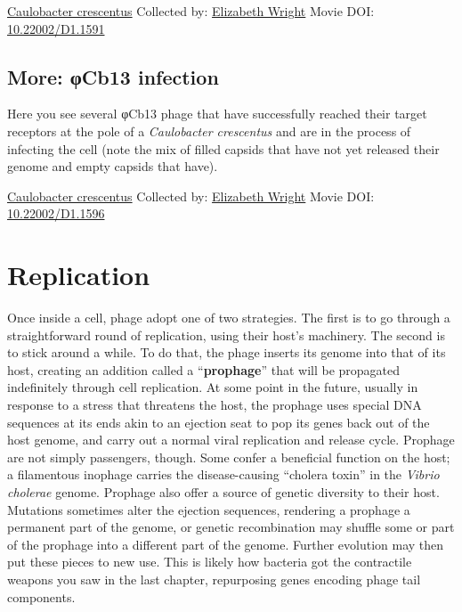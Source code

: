 \documentclass[]{tufte-book}
\begin{document}
\hypertarget{htmlwidget-69c7801d9096ef8e00a6}{}

\label{fig:10-6}\protect\hyperlink{tree}{Caulobacter crescentus} Collected by: \protect\hyperlink{elizabeth_wright}{Elizabeth Wright} Movie DOI: \href{https://doi.org/10.22002/D1.1591}{10.22002/D1.1591}

\hypertarget{ux3c6Cb13_infection}{%
\subsection*{More: φCb13 infection}\label{ux3c6Cb13_infection}}

Here you see several φCb13 phage that have successfully reached their target receptors at the pole of a \emph{Caulobacter crescentus} and are in the process of infecting the cell (note the mix of filled capsids that have not yet released their genome and empty capsids that have).



\hypertarget{htmlwidget-ed3b31bec6cdc505b2fe}{}

\label{fig:10-6a}\protect\hyperlink{tree}{Caulobacter crescentus} Collected by: \protect\hyperlink{elizabeth_wright}{Elizabeth Wright} Movie DOI: \href{https://doi.org/10.22002/D1.1596}{10.22002/D1.1596}

\hypertarget{replication}{%
\section{Replication}\label{replication}}

Once inside a cell, phage adopt one of two strategies. The first is to go through a straightforward round of replication, using their host's machinery. The second is to stick around a while. To do that, the phage inserts its genome into that of its host, creating an addition called a ``\textbf{prophage}'' that will be propagated indefinitely through cell replication. At some point in the future, usually in response to a stress that threatens the host, the prophage uses special DNA sequences at its ends akin to an ejection seat to pop its genes back out of the host genome, and carry out a normal viral replication and release cycle. Prophage are not simply passengers, though. Some confer a beneficial function on the host; a filamentous inophage carries the disease-causing ``cholera toxin'' in the \emph{Vibrio cholerae} genome. Prophage also offer a source of genetic diversity to their host. Mutations sometimes alter the ejection sequences, rendering a prophage a permanent part of the genome, or genetic recombination may shuffle some or part of the prophage into a different part of the genome. Further evolution may then put these pieces to new use. This is likely how bacteria got the contractile weapons you saw in the last chapter, repurposing genes encoding phage tail components.
\end{document}
